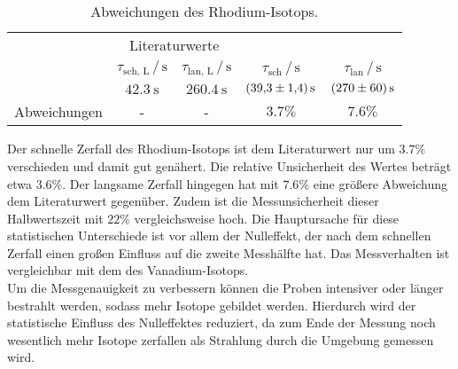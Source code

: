\begin{table}
    \centering
    \caption{Abweichungen des Rhodium-Isotops.}
    \label{tab:abwRh}
    \begin{tabular}{c c c c c}
        \toprule
        & \multicolumn{2}{c}{Literaturwerte\cite{RhIsotopes}} & & \\
        & $\tau_\text{sch, L}\,/\,\si{\second}$ & $\tau_\text{lan, L}\,/\,\si{\second}$ & $\tau_\text{sch}\,/\,\si{\second}$ & $\tau_\text{lan}\,/\,\si{\second}$ \\
        \midrule
        & $\SI{42.3}{\second}$ & $\SI{260.4}{\second}$ & $\SI{39.3\pm1.4}{\second}$ & $\SI{270\pm60}{\second}$ \\
        Abweichungen & - & - & $3.7\%$ & $7.6\%$ \\
        \bottomrule
    \end{tabular}
\end{table}

Der schnelle Zerfall des Rhodium-Isotops ist dem Literaturwert nur um $3.7\%$ verschieden und damit gut genähert. Die relative Unsicherheit des Wertes beträgt etwa $3.6\%$.
Der langsame Zerfall hingegen hat mit $7.6\%$ eine größere Abweichung dem Literaturwert gegenüber. Zudem ist die Messunsicherheit dieser Halbwertszeit mit $22\%$ vergleichsweise hoch.
Die Hauptursache für diese statistischen Unterschiede ist vor allem der Nulleffekt, der nach dem schnellen Zerfall einen großen Einfluss auf die zweite Messhälfte hat.
Das Messverhalten ist vergleichbar mit dem des Vanadium-Isotops. \\

Um die Messgenauigkeit zu verbessern können die Proben intensiver oder länger bestrahlt werden, sodass mehr Isotope gebildet werden. Hierdurch wird der statistische Einfluss
des Nulleffektes reduziert, da zum Ende der Messung noch wesentlich mehr Isotope zerfallen als Strahlung durch die Umgebung gemessen wird.
